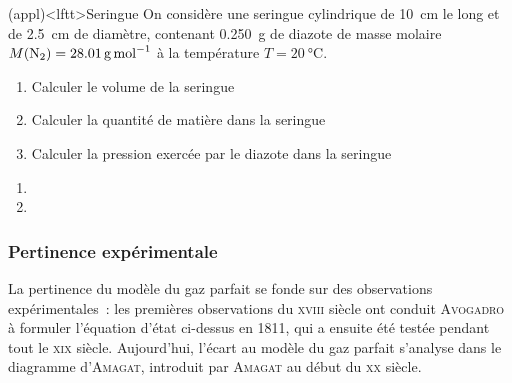 \documentclass[../../main/main.tex]{subfiles}
\begin{document}
\begin{tcb}[label=appl:gp, sidebyside](appl)<lftt>{Seringue}
	On considère une seringue cylindrique de \SI{10}{cm} le long et de
	\SI{2.5}{cm} de diamètre, contenant \SI{0.250}{g} de diazote de masse
	molaire $M({\rm N}_2) = \SI{28.01}{g.mol^{-1}}$ à la
	température $T = \SI{20}{\degreeCelsius}$.
	\begin{enumerate}
		\item Calculer le volume de la seringue
		\item Calculer la quantité de matière dans la seringue
		\item Calculer la pression exercée par le diazote dans la seringue
	\end{enumerate}
	\tcblower
	\begin{enumerate}
		\item
		\item
		      \mitem
	\end{enumerate}
\end{tcb}

\subsubsection{Pertinence expérimentale}

La pertinence du modèle du gaz parfait se fonde sur des observations
expérimentales~: les premières observations du \textsc{xviii}\ieme{} siècle ont
conduit \textsc{Avogadro} à formuler l'équation d'état ci-dessus en 1811, qui a
ensuite été testée pendant tout le \textsc{xix}\ieme{} siècle. Aujourd'hui,
l'écart au modèle du gaz parfait s'analyse dans le diagramme d'\textsc{Amagat}, introduit
par \textsc{Amagat} au début du \textsc{xx}\ieme{} siècle.
\end{document}
